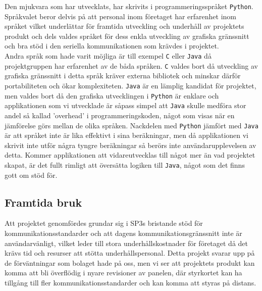 \documentclass{article}
\begin{document}
            Den mjukvara som har utvecklats, har skrivits i programmeringsspråket \texttt{Python}. Språk\-valet beror delvis på att personal inom företaget har erfarenhet inom språket vilket underlättar för framtida utveckling och underhåll av projektets produkt och dels valdes språket för dess enkla utveckling av grafiska gränssnitt och bra stöd i den seriella kommunikationen som krävdes i projektet. \\

            \noindent Andra språk som hade varit möjliga är till exempel \texttt{C} eller \texttt{Java} då projektgruppen har erfarenhet av de båda språken. \texttt{C} valdes bort då utveckling av grafiska gränssnitt i detta språk kräver externa bibliotek och minskar därför portabiliteten och ökar komplexiteten. \texttt{Java} är en lämplig kandidat för projektet, men valdes bort då den grafiska utvecklingen i \texttt{Python} är enklare och applikationen som vi utvecklade är såpass simpel att \texttt{Java} skulle medföra stor andel så kallad 'overhead' i programmeringskoden, något som visas när en jämförelse görs mellan de olika språken.\cite{Ferg}  Nackdelen med \texttt{Python} jämfört med \texttt{Java} är att språket inte är lika effektivt i sina beräkningar, men då applikationen vi skrivit inte utför några tyngre beräkningar så berörs inte användar\-upplevelsen  av detta. Kommer applikationen att vidareutvecklas till något mer än vad projektet skapat, är det fullt rimligt att översätta logiken till \texttt{Java}, något som det finns gott om stöd för.\cite{jython}
        
        \subsection{Framtida bruk} %
        \label{sub:framtida_bruk}
            Att projektet genomfördes grundar sig i SP3s bristande stöd för kommunikationsstandarder och att dagens kommunikationsgränssnitt inte är användarvänligt, vilket leder till stora underhållskostnader för företaget då det krävs tid och resurser att stötta underhålls\-personal. Detta projekt svarar upp på de förväntningar som bolaget hade på oss, men vi ser att projektets produkt kan komma att bli överflödig i nyare revisioner av panelen, där styrkortet kan ha tillgång till fler kommunikationsstandarder och kan komma att styras på distans.

    \newpage
\end{document}
